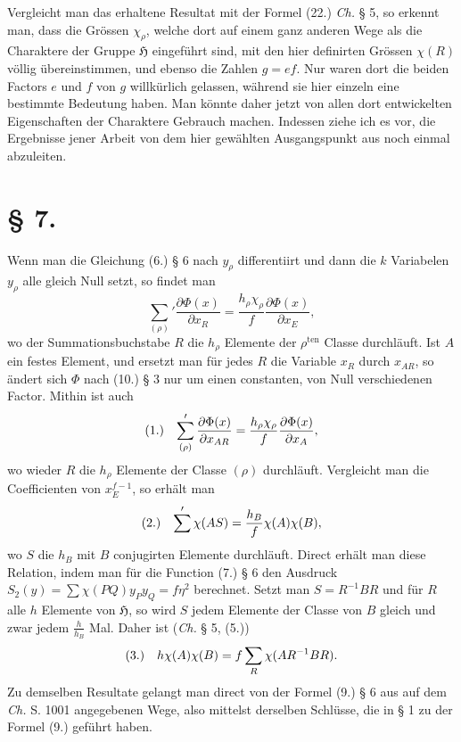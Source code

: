 \documentclass[11pt]{article}
\makeatletter
\newcommand{\Hgrp}{\mathfrak{H}}
\newcommand{\frobtagc}[2]{\[\begin{array}{@{}r@{\quad}c@{}}\textup{(#1)} & \displaystyle #2\end{array}\]}
\makeatother
\begin{document}
Vergleicht man das erhaltene Resultat mit der Formel (22.) \emph{Ch.} § 5, so erkennt man, dass die Grössen $\chi_\rho$, welche dort auf einem ganz anderen Wege als die Charaktere der Gruppe $\Hgrp$ eingeführt sind, mit den hier definirten Grössen $\chi(R)$ völlig übereinstimmen, und ebenso die Zahlen $g=ef$. Nur waren dort die beiden Factors $e$ und $f$ von $g$ willkürlich gelassen, während sie hier einzeln eine bestimmte Bedeutung haben. Man könnte daher jetzt von allen dort entwickelten Eigenschaften der Charaktere Gebrauch machen. Indessen ziehe ich es vor, die Ergebnisse jener Arbeit von dem hier gewählten Ausgangspunkt aus noch einmal abzuleiten.

\section*{§ 7.}

Wenn man die Gleichung (6.) § 6 nach $y_\rho$ differentiirt und dann die $k$ Variabelen $y_\rho$ alle gleich Null setzt, so findet man
\[
\sum_{(\rho)}'\frac{\partial\Phi(x)}{\partial x_R}=\frac{h_\rho\chi_\rho}{f}\frac{\partial\Phi(x)}{\partial x_E},
\]
wo der Summationsbuchstabe $R$ die $h_\rho$ Elemente der $\rho^{\mathrm{ten}}$ Classe durchläuft. Ist $A$ ein festes Element, und ersetzt man für jedes $R$ die Variable $x_R$ durch $x_{AR}$, so ändert sich $\Phi$ nach (10.) § 3 nur um einen constanten, von Null verschiedenen Factor. Mithin ist auch
\frobtagc{1.}{\sum_{(\rho)}'\frac{\partial\Phi(x)}{\partial x_{AR}}=\frac{h_\rho\chi_\rho}{f}\frac{\partial\Phi(x)}{\partial x_A},}
wo wieder $R$ die $h_\rho$ Elemente der Classe $(\rho)$ durchläuft. Vergleicht man die Coefficienten von $x_E^{f-1}$, so erhält man
\frobtagc{2.}{\sum'\chi(AS)=\frac{h_B}{f}\chi(A)\chi(B),}
wo $S$ die $h_B$ mit $B$ conjugirten Elemente durchläuft. Direct erhält man diese Relation, indem man für die Function (7.) § 6 den Ausdruck $S_2(y)=\sum\chi(PQ)y_Py_Q=f\eta^2$ berechnet. Setzt man $S=R^{-1}BR$ und für $R$ alle $h$ Elemente von $\Hgrp$, so wird $S$ jedem Elemente der Classe von $B$ gleich und zwar jedem $\frac{h}{h_B}$ Mal. Daher ist (\emph{Ch.} § 5, (5.))
\frobtagc{3.}{h\chi(A)\chi(B)=f\sum_R\chi(AR^{-1}BR).}
Zu demselben Resultate gelangt man direct von der Formel (9.) § 6 aus auf dem \emph{Ch.} S. 1001 angegebenen Wege, also mittelst derselben Schlüsse, die in § 1 zu der Formel (9.) geführt haben.
\end{document}
